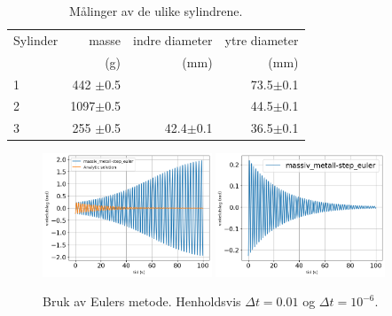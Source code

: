 \documentclass[5p]{elsarticle}
\begin{document}
\begin{table}[h!]
	\begin{center}
		\caption{Målinger av de ulike sylindrene.}
		\label{MinLilleTabell}	%
		\begin{tabular}{lrrr} 		%
			\hline 								%
		    Sylinder &  masse  & indre diameter & ytre diameter \\ %
			&  (g)    &   (mm)   &  (mm)    \\ %
			\hline												
			1   &  442 \(\pm\)0.5 & 	  & 73.5\(\pm\)0.1 \\ %
			2   &  1097\(\pm\)0.5 & 	  & 44.5\(\pm\)0.1 \\ %
			3   &  255 \(\pm\)0.5 & 42.4\(\pm\)0.1 & 36.5\(\pm\)0.1 \\ %
			\hline
		\end{tabular}
	\end{center}
\end{table}


\begin{figure}[p] 
	\begin{center}
        	\includegraphics[width=0.45\textwidth]{img/massiv_metall-step_euler.png}
        	\includegraphics[width=0.45\textwidth]{img/massiv_metall-step_euler-plot.png}
        \end{center}
	\caption{Bruk av Eulers metode. Henholdsvis \(\Delta t = 0.01\) og \(\Delta t = 10^{-6}\).}
	\label{Fig step-Euler} %
\end{figure}
\end{document}

